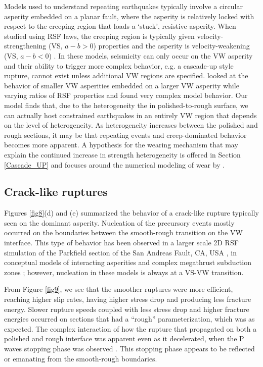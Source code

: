 \documentclass[preprint,1p, 10pt,authoryear]{elsarticle}
\begin{document}
Models used to understand repeating earthquakes typically involve a circular asperity embedded on a planar fault, where the asperity is relatively locked with respect to the creeping region that loads a `stuck', resistive asperity. When studied using RSF laws, the creeping region is typically given velocity-strengthening (VS, $a-b>0$) properties and the asperity is velocity-weakening  (VS, $a-b<0$) \citep{Kato2003,Chen2009}. In these models, seismicity can only occur on the VW asperity and their ability to trigger more complex behavior, e.g. a cascade-up style rupture, cannot exist unless additional VW regions are specified. \citet{Noda2013} looked at the behavior of smaller VW asperities embedded on a larger VW asperity while varying ratios of RSF properties and found very complex model behavior. Our model finds that, due to the heterogeneity the in polished-to-rough surface, we can actually host constrained earthquakes in an entirely VW region that depends on the level of heterogeneity.  As heterogeneity increases between the polished and rough sections, it may be that repeating events and creep-dominated behavior becomes more apparent.  A hypothesis for the wearing mechanism that may explain the continued increase in strength heterogeneity is offered in Section \ref{Cascade_UP} and focuses around the numerical modeling of wear by \citet{Aghababaei2016}.

\subsection{Crack-like ruptures}
Figures \ref{fig8}(d) and  (e) summarized the behavior of a crack-like rupture typically seen on the dominant asperity. Nucleation of the precursory events mostly occurred on the boundaries between the smooth-rough transition on the VW interface. This type of behavior has been observed in a larger scale 2D RSF simulation of the Parkfield section of the San Andreas Fault, CA, USA \citep{Barbot2012}, in conceptual models of interacting asperities \citep{Kato2003} and complex megathrust subduction zones \citep{Kaneko2010}; however, nucleation in these models is always at a VS-VW transition. 

From Figure \ref{fig9}, we see that the smoother ruptures were more efficient, reaching higher slip rates, having higher stress drop and producing less fracture energy. Slower rupture speeds coupled with less stress drop and higher fracture energies occurred on sections that had a ``rough'' parameterization, which was as expected.  The complex interaction of how the rupture that propagated on both a polished and rough interface was apparent even as it decelerated, when the P waves stopping phase was observed \citep{Madariaga1976}. This stopping phase appears to be reflected or emanating from the smooth-rough boundaries. 
\end{document}

